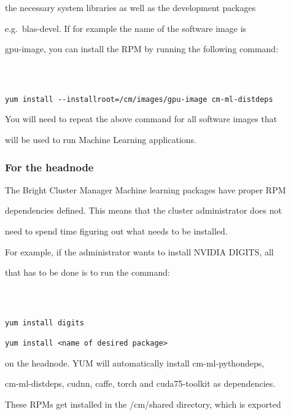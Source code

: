 \documentclass[]{article}
\begin{document}
the necessary system libraries as well as the development packages

e.g.~blas-devel. If for example the name of the software image is

gpu-image, you can install the RPM by running the following command:



\begin{verbatim}



yum install --installroot=/cm/images/gpu-image cm-ml-distdeps

\end{verbatim}



You will need to repeat the above command for all software images that

will be used to run Machine Learning applications.



\subsubsection{For the headnode}\label{for-the-headnode}



The Bright Cluster Manager Machine learning packages have proper RPM

dependencies defined. This means that the cluster administrator does not

need to spend time figuring out what needs to be installed.



For example, if the administrator wants to install NVIDIA DIGITS, all

that has to be done is to run the command:



\begin{verbatim}



yum install digits

yum install <name of desired package>

\end{verbatim}



on the headnode. YUM will automatically install cm-ml-pythondeps,

cm-ml-distdeps, cudnn, caffe, torch and cuda75-toolkit as dependencies.

These RPMs get installed in the /cm/shared directory, which is exported
\end{document}
